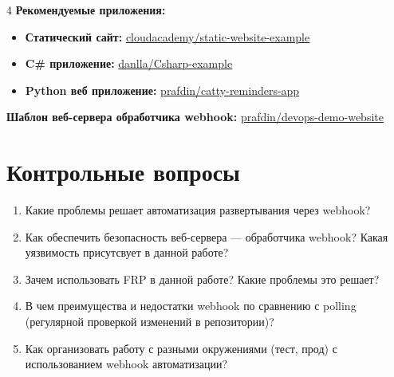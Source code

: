 \documentclass[12pt,a4paper]{article}
\begin{document}
\begin{task}{4}
    \textbf{Рекомендуемые приложения:}
    \begin{itemize}
        \item \textbf{Статический сайт:} \href{https://github.com/cloudacademy/static-website-example.git}{cloudacademy/static-website-example}
        \item \textbf{C\# приложение:} \href{https://github.com/danlla/Csharp-example}{danlla/Csharp-example}
        \item \textbf{Python веб приложение:} \href{https://github.com/prafdin/catty-reminders-app.git}{prafdin/catty-reminders-app}
    \end{itemize}

    \textbf{Шаблон веб-сервера обработчика webhook:}
    \href{https://github.com/prafdin/devops-demo-website/blob/webhook-demo/webhook-server.py}{prafdin/devops-demo-website}
\end{task}

\section{Контрольные вопросы}
\begin{enumerate}
    \item Какие проблемы решает автоматизация развертывания через webhook?
    \item Как обеспечить безопасность веб-сервера — обработчика webhook? Какая уязвимость присутсвует в данной работе?
    \item Зачем использовать FRP в данной работе? Какие проблемы это решает?
    \item В чем преимущества и недостатки webhook по сравнению с polling (регулярной проверкой изменений в репозитории)?
    \item Как организовать работу с разными окружениями (тест, прод) с использованием webhook автоматизации?
\end{enumerate}
\end{document}
